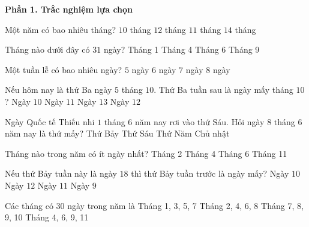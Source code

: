 \textbf{Phần 1. Trắc nghiệm lựa chọn}

\begin{ex} %
Một năm có bao nhiêu tháng?
\choice
{$10$ tháng}
{\True $12$ tháng}
{$11$ tháng}
{$14$ tháng}
\end{ex}

\begin{ex} %
Tháng nào dưới đây có $31$ ngày?
\choice
{\True Tháng 1}
{Tháng 4}
{Tháng 6}
{Tháng 9}
\end{ex}

\begin{ex} %
Một tuần lễ có bao nhiêu ngày?
\choice
{$5$ ngày}
{$6$ ngày}
{\True $7$ ngày}
{$8$ ngày}
\end{ex}

\begin{ex} %
Nếu hôm nay là thứ Ba ngày $5$ tháng $10$. Thứ Ba tuần sau là ngày mấy tháng $10$?
\choice
{Ngày $10$}
{Ngày $11$}
{Ngày $13$}
{\True Ngày $12$}
\end{ex}

\begin{ex} %
Ngày Quốc tế Thiếu nhi $1$ tháng $6$ năm nay rơi vào thứ Sáu. Hỏi ngày $8$ tháng $6$ năm nay là thứ mấy?
\choice
{Thứ Bảy}
{\True Thứ Sáu}
{Thứ Năm}
{Chủ nhật}
\end{ex}

\begin{ex} %
Tháng nào trong năm có ít ngày nhất?
\choice
{\True Tháng 2}
{Tháng 4}
{Tháng 6}
{Tháng 11}
\end{ex}

\begin{ex} %
Nếu thứ Bảy tuần này là ngày $18$ thì thứ Bảy tuần trước là ngày mấy?
\choice
{Ngày $10$}
{Ngày $12$}
{\True Ngày $11$}
{Ngày $9$}
\end{ex}

\begin{ex} %
Các tháng có $30$ ngày trong năm là
\choice
{Tháng 1, 3, 5, 7}
{Tháng 2, 4, 6, 8}
{Tháng 7, 8, 9, 10}
{\True Tháng 4, 6, 9, 11}
\end{ex}

